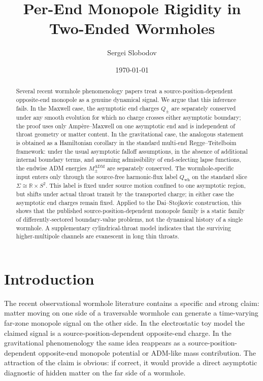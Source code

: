 \documentclass[aps,prd,onecolumn,nofootinbib,superscriptaddress]{revtex4-2}
\begin{document}
\title{Per-End Monopole Rigidity in Two-Ended Wormholes}

\author{Sergei Slobodov}

\date{\today}

\begin{abstract}
Several recent wormhole phenomenology papers treat a source-position-dependent opposite-end monopole as a genuine dynamical signal. We argue that this inference fails. In the Maxwell case, the asymptotic end charges $Q_\pm$ are separately conserved under any smooth evolution for which no charge crosses either asymptotic boundary; the proof uses only Amp\`ere--Maxwell on one asymptotic end and is independent of throat geometry or matter content. In the gravitational case, the analogous statement is obtained as a Hamiltonian corollary in the standard multi-end Regge--Teitelboim framework: under the usual asymptotic falloff assumptions, in the absence of additional internal boundary terms, and assuming admissibility of end-selecting lapse functions, the endwise ADM energies $M_\pm^{\mathrm{ADM}}$ are separately conserved. The wormhole-specific input enters only through the source-free harmonic-flux label $Q_{\mathrm{wh}}$ on the standard slice $\Sigma \cong \mathbb{R}\times S^2$. This label is fixed under source motion confined to one asymptotic region, but shifts under actual throat transit by the transported charge; in either case the asymptotic end charges remain fixed. Applied to the Dai--Stojkovic construction, this shows that the published source-position-dependent monopole family is a static family of differently-sectored boundary-value problems, not the dynamical history of a single wormhole. A supplementary cylindrical-throat model indicates that the surviving higher-multipole channels are evanescent in long thin throats.
\end{abstract}

\maketitle

\section{Introduction}
\label{sec:intro}

The recent observational wormhole literature contains a specific and strong claim: matter moving on one side of a traversable wormhole can generate a time-varying far-zone monopole signal on the other side.\cite{DaiStojkovic2019Observing,DaiStojkovic2020ReplyObserving,SimonettiEtAl2021SensitiveSearches,BaoHouZhang2023GWScattering,BambiStojkovic2021AstrophysicalWormholes} In the electrostatic toy model the claimed signal is a source-position-dependent opposite-end charge. In the gravitational phenomenology the same idea reappears as a source-position-dependent opposite-end monopole potential or ADM-like mass contribution. The attraction of the claim is obvious: if correct, it would provide a direct asymptotic diagnostic of hidden matter on the far side of a wormhole.
\end{document}
